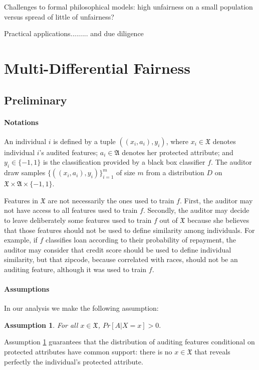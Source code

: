 \documentclass{article}
\newtheorem{assumption}{Assumption}
\begin{document}
Challenges to formal philosophical models: high unfairness on a small population versus spread of little of unfairness?

Practical applications......... and due diligence


\section{Multi-Differential Fairness}

\subsection{Preliminary}

\paragraph{Notations}
An individual $i$ is defined by a tuple $((x_{i}, a_{i}), y_{i})$, where $x_{i}\in \mathfrak{X}$ denotes individual $i$'s audited features; $a_{i}\in\mathfrak{A}$ denotes her protected attribute; and $y_{i}\in \{-1, 1\}$ is the classification provided by a black box classifier $f$. The auditor draw samples $
\{((x_{i}, a_{i}), y_{i})\}_{i=1}^{m}$ of size $m$ from a distribution $D$ on $\mathfrak{X} \times \mathfrak{A}\times \{-1, 1\}$. 

\bigskip
Features in $\mathfrak{X}$ are not necessarily the ones used to train $f$. First, the auditor may not have access to all features used to train $f$. Secondly, the auditor may decide to leave deliberately some features used to train $f$ out of $\mathfrak{X}$ because she believes that those features should not be used to define similarity among individuals. For example, if $f$ classifies loan according to their probability of repayment, the auditor may consider that credit score should be used to define individual similarity, but that zipcode, because correlated with races, should not be an auditing feature, although it was used to train $f$.  

\paragraph{Assumptions}
In our analysis we make the following assumption:
\begin{assumption}
\label{ass: 1}
For all $x\in \mathfrak{X}$, $Pr[A|X=x] > 0.$
\end{assumption}
Assumption \ref{ass: 1} guarantees that the distribution of auditing features conditional on protected attributes have common support: there is no $x\in \mathfrak{X}$ that reveals perfectly the individual's protected attribute.  
\end{document}
